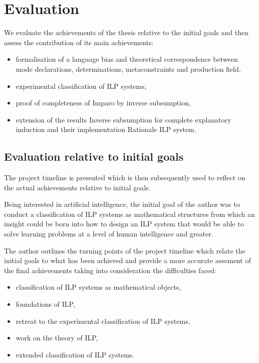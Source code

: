 \chapter{Evaluation}
We evaluate the achievements of the thesis relative to the initial goals and then assess the contribution of its main achievements:
\begin{itemize}
\item formalisation of a language bias and theoretical correspondence between mode declarations, determinations, metaconstraints and production field,
\item experimental classification of ILP systems,
\item proof of completeness of Imparo by inverse subsumption,
\item extension of the results Inverse subsumption for complete explanatory induction and their implementation Rationale ILP system.
\end{itemize}

\section{Evaluation relative to initial goals}
The project timeline is presented which is then subsequently used to reflect on the actual achievements relative to initial goals.

Being interested in artificial intelligence, the initial goal of the author was to conduct a classification of ILP systems as mathematical structures from which an insight could be born into how to design an ILP system that would be able to solve learning problems at a level of human intelligence and greater.


The author outlines the turning points of the project timeline which relate the initial goals to what has been achieved and provide a more accurate assement of the final achievements taking into consideration the difficulties faced:

\begin{itemize}
\item classification of ILP systems as mathematical objects,
\item foundations of ILP,
\item retreat to the experimental classification of ILP systems,
\item work on the theory of ILP,
\item extended classification of ILP systems.
\end{itemize}

